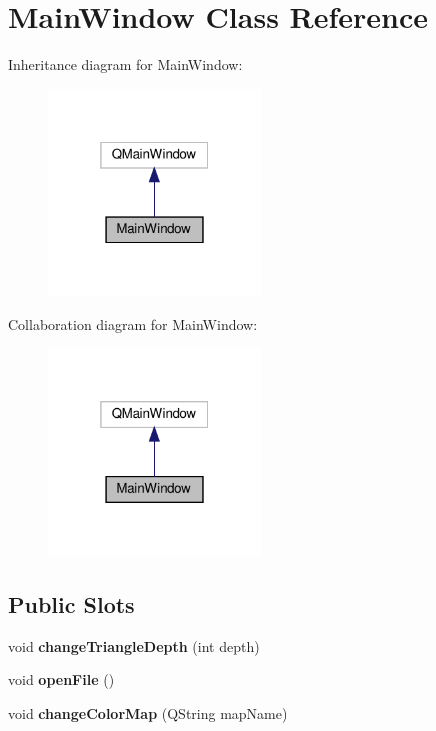 \hypertarget{class_main_window}{}\section{Main\+Window Class Reference}
\label{class_main_window}


Inheritance diagram for Main\+Window\+:
\nopagebreak
\begin{figure}[H]
\begin{center}
\leavevmode
\includegraphics[width=160pt]{class_main_window__inherit__graph}
\end{center}
\end{figure}


Collaboration diagram for Main\+Window\+:
\nopagebreak
\begin{figure}[H]
\begin{center}
\leavevmode
\includegraphics[width=160pt]{class_main_window__coll__graph}
\end{center}
\end{figure}
\subsection*{Public Slots}
\begin{DoxyCompactItemize}
\item 
\mbox{\label{class_main_window_a7bdf36376a7474c5218923ed66baa937}} 
void {\bfseries change\+Triangle\+Depth} (int depth)
\item 
\mbox{\label{class_main_window_a288b768c3c21a9171bdc56fe845ece8b}} 
void {\bfseries open\+File} ()
\item 
\mbox{\label{class_main_window_a1cfcf14a3dbba8db45a2444a0fbe5a9f}} 
void {\bfseries change\+Color\+Map} (Q\+String map\+Name)
\end{DoxyCompactItemize}
